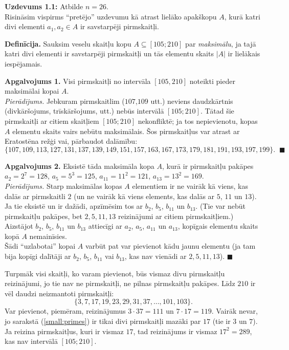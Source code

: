 \documentclass[a4paper,12pt]{article}
\begin{document}
\newpage

{\bf Uzdevums 1.1:} Atbilde $n = 26$.\\
Risināsim vispirms ``pretējo'' uzdevumu \textendash{} kā atrast lielāko apakškopu $A$,
kurā katri divi elementi $a_1,a_2 \in A$ ir savstarpēji pirmskaitļi. 

{\bf Definīcija.} Sauksim veselu skaitļu kopu $A \subseteq [105;210]$ par {\em maksimālu}, 
ja tajā katri divi elementi ir savstarpēji pirmskaitļi un tās elementu skaits $|A|$ ir lielākais iespējamais.

{\bf Apgalvojums 1.} Visi pirmskaitļi no intervāla $[105,210]$ noteikti pieder maksimālai kopai $A$.\\
{\em Pierādījums.} Jebkuram pirmskaitlim ($107$,$109$ utt.) neviens daudzkārtnis (divkāršojums, trīskāršojums, utt.) 
nebūs intervālā $[105;210]$. Tātad šie pirmskaitļi ar citiem skaitļiem $[105;210]$ nekonfliktē; ja tos nepievienotu, 
kopas $A$ elementu skaits vairs nebūtu maksimālais. Šos pirmskaitļus var atrast ar Eratostēna režģi vai, 
pārbaudot dalāmību:
$$\{ 107, 109, 113, 127, 131, 137, 139, 149, 151, 157, 163, 167, 173, 179, 181, 191, 193, 197, 199\}.\;\;\blacksquare$$

{\bf Apgalvojums 2.} Eksistē tāda maksimāla kopa $A$, kurā ir pirmskaitļu pakāpes $a_2 = 2^7 = 128$,  
$a_5 = 5^3 = 125$, $a_{11} = 11^2 = 121$, $a_{13} = 13^2 = 169$.\\
{\em Pierādījums.} Starp maksimālas kopas $A$ elementiem ir ne vairāk kā viens, kas dalās ar pirmskaitli $2$ 
(un ne vairāk kā viens elements, kas dalās ar $5$, $11$ un $13$). Ja tie eksistē un ir dažādi, apzīmēsim tos ar $b_2$, 
$b_5$, $b_{11}$ un $b_{13}$. (Tie var nebūt pirmskaitļu pakāpes, bet 
$2,5,11,13$ reizinājumi ar citiem pirmskaitļiem.)
Aizstājot $b_2$, $b_5$, $b_{11}$ un $b_{13}$ attiecīgi ar 
$a_2$, $a_5$, $a_{11}$ un $a_{13}$, kopīgais elementu skaits kopā $A$ nemainīsies.\\ 
Šādi ``uzlabotai'' kopai $A$ varbūt pat var pievienot 
kādu jaunu elementu (ja tam bija kopīgi dalītāji ar
$b_2$, $b_5$, $b_{11}$ vai $b_{13}$, kas nav vienādi ar $2,5,11,13$). $\blacksquare$

Turpmāk visi skaitļi, ko varam pievienot, būs vismaz divu pirmskaitļu reizinājumi, jo tie nav ne pirmskaitļi, ne pilnas
pirmskaitļu pakāpes.  Līdz $210$ ir vēl daudzi neizmantoti pirmskaitļi: 
\begin{equation}
\label{small:primes}
\{ 3, 7, 17, 19, 23, 29, 31, 37, \ldots, 101,103 \}.
\end{equation}
Var pievienot, piemēram, reizinājumus $3 \cdot 37 = 111$ un $7 \cdot 17 = 119$.
Vairāk nevar, jo sarakstā (\ref{small:primes})
ir tikai divi pirmskaitļi mazāki par $17$ (tie ir $3$ un $7$). Ja reizina
pirmskaitļus, kuri ir vismaz $17$, 
tad reizinājums ir vismaz $17^2 = 289$, kas nav intervālā $[105;210]$. 
\end{document}
